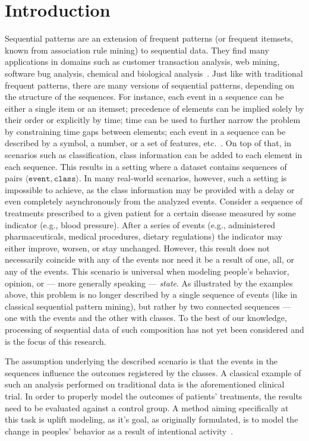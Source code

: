 \documentclass[runningheads,a4paper]{llncs}
\begin{document}
\section{Introduction}
\label{sec:introduction}

Sequential patterns are an extension of frequent patterns (or frequent itemsets, known from association rule mining) to sequential data.
They find many applications in domains such as customer transaction analysis, web mining, software bug analysis, chemical and biological analysis~\cite{Aggarwal:2014}.
Just like with traditional frequent patterns, there are many versions of sequential patterns, depending on the structure of the sequences.
For instance, each event in a sequence can be either a single item or an itemset; precedence of elements can be implied solely by their order or explicitly by time; time can be used to further narrow the problem by constraining time gaps between elements; each event in a sequence can be described by a symbol, a number, or a set of features, etc.~\cite{Dong:2009}.
On top of that, in scenarios such as classification, class information can be added to each element in each sequence.
This results in a setting where a dataset contains sequences of pairs $\langle\texttt{event}, \texttt{class}\rangle$.
In many real-world scenarios, however, such a setting is impossible to achieve, as the class information may be provided with a delay or even completely asynchronously from the analyzed events.
Consider a sequence of treatments prescribed to a given patient for a certain disease measured by some indicator (e.g., blood pressure).
After a series of events (e.g., administered pharmaceuticals, medical procedures, dietary regulations) the indicator may either improve, worsen, or stay unchanged.
However, this result does not necessarily coincide with any of the events nor need it be a result of one, all, or any of the events.
This scenario is universal when modeling people's behavior, opinion, or --- more generally speaking --- \textit{state}.
As illustrated by the examples above, this problem is no longer described by a single sequence of events (like in classical sequential pattern mining), but rather by two connected sequences --- one with the events and the other with classes.
To the best of our knowledge, processing of sequential data of such composition has not yet been considered and is the focus of this research.

The assumption underlying the described scenario is that the events in the sequences influence the outcomes registered by the classes.
A classical example of such an analysis performed on traditional data is the aforementioned clinical trial.
In order to properly model the outcomes of patients' treatments, the results need to be evaluated against a control group.
A method aiming specifically at this task is uplift modeling, as it's goal, as originally formulated, is to model the change in peoples' behavior as a result of intentional activity~\cite{Radcliffe:1999}.
\end{document}
